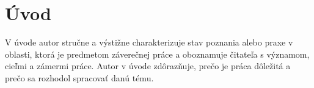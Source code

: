 \chapter{Úvod}

V úvode autor stručne a výstižne charakterizuje stav poznania alebo praxe v oblasti, ktorá je predmetom záverečnej práce a oboznamuje čitateľa s významom, cieľmi a zámermi práce. Autor v úvode zdôrazňuje, prečo je práca dôležitá a prečo sa rozhodol spracovať danú tému.




%
